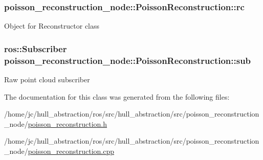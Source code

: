 \subsubsection[{\texorpdfstring{rc}{rc}}]{ poisson\+\_\+reconstruction\+\_\+node\+::\+Poisson\+Reconstruction\+::rc\hspace{0.3cm}{\ttfamily [private]}}\hypertarget{classpoisson__reconstruction__node_1_1_poisson_reconstruction_a4630f308fbba0aa64e41f0044d950063}{}\label{classpoisson__reconstruction__node_1_1_poisson_reconstruction_a4630f308fbba0aa64e41f0044d950063}
Object for Reconstructor class 
\subsubsection[{\texorpdfstring{sub}{sub}}]{\setlength{\rightskip}{0pt plus 5cm}ros\+::\+Subscriber poisson\+\_\+reconstruction\+\_\+node\+::\+Poisson\+Reconstruction\+::sub\hspace{0.3cm}{\ttfamily [private]}}\hypertarget{classpoisson__reconstruction__node_1_1_poisson_reconstruction_a2ea0793db79cbde2bd6195fe3f473392}{}\label{classpoisson__reconstruction__node_1_1_poisson_reconstruction_a2ea0793db79cbde2bd6195fe3f473392}
Raw point cloud subscriber 

The documentation for this class was generated from the following files\+:\begin{DoxyCompactItemize}
\item 
/home/jc/hull\+\_\+abstraction/ros/src/hull\+\_\+abstraction/src/poisson\+\_\+reconstruction\+\_\+node/\hyperlink{poisson__reconstruction_8h}{poisson\+\_\+reconstruction.\+h}\item 
/home/jc/hull\+\_\+abstraction/ros/src/hull\+\_\+abstraction/src/poisson\+\_\+reconstruction\+\_\+node/\hyperlink{poisson__reconstruction_8cpp}{poisson\+\_\+reconstruction.\+cpp}\end{DoxyCompactItemize}
